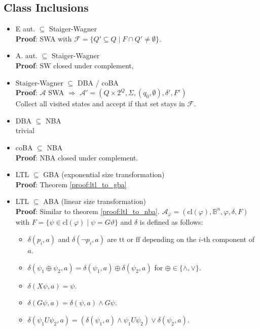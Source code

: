 \documentclass{article}
\begin{document}
\subsection{Class Inclusions}
\begin{itemize}
	\item E aut. $\subseteq$ Staiger-Wagner \\
		\textbf{Proof}: SWA with $\mathcal{F} = \{ Q' \subseteq Q \mid F \cap Q' \neq \emptyset \}$.
    \item A. aut. $\subseteq$ Staiger-Wagner \\
    	\textbf{Proof}: SW closed under complement,
    \item Staiger-Wagner $\subseteq$ DBA / coBA \\
    	\textbf{Proof}: $\mathcal{A}$ SWA $\Rightarrow$ $\mathcal{A}' = (Q \times 2^Q, \Sigma, (q_0, \emptyset), \delta', F')$ \\
    	Collect all visited states and accept if that set stays in $\mathcal{F}$.
    \item DBA $\subseteq$ NBA \\
    	trivial
    \item coBA $\subseteq$ NBA \\
    	\textbf{Proof}: NBA closed under complement.
    \item LTL $\subseteq$ GBA (exponential size transformation) \\
    	\textbf{Proof}: Theorem \ref{proof:ltl_to_gba}
    \item LTL $\subseteq$ ABA (linear size transformation) \\
    	\textbf{Proof}: Similar to theorem \ref{proof:ltl_to_nba}. $\mathcal{A}_\varphi = (\text{cl}(\varphi), \mathbb{B}^n, \varphi, \delta, F)$ with $F = \{ \psi \in \text{cl}(\varphi) \mid \psi = G \vartheta \}$ and $\delta$ is defined as follows:
    	\begin{itemize}
    		\item $\delta(p_i, a)$ and $\delta(\neg p_i, a)$ are $\text{tt}$ or $\text{ff}$ depending on the $i$-th component of $a$.
    		\item $\delta(\psi_1 \oplus \psi_2, a) = \delta(\psi_1, a) \oplus \delta(\psi_2, a)$ for $\oplus \in \{\land, \lor\}$.
    		\item $\delta(X \psi, a) = \psi$.
    		\item $\delta(G \psi, a) = \delta(\psi, a) \land G \psi$.
    		\item $\delta(\psi_1 U \psi_2, a) = (\delta(\psi_1, a) \land \psi_1 U \psi_2) \lor \delta(\psi_2, a)$.
    	\end{itemize}
\end{itemize}
\end{document}
